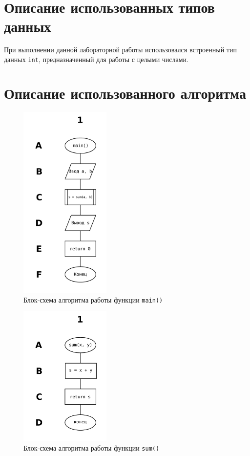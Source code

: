 \documentclass[12pt,a4paper,oneside]{article}
\begin{document}
\section{Описание использованных типов данных}

При выполнении данной лабораторной работы использовался
встроенный тип данных \texttt{int},
предназначенный для работы с целыми числами.


\section{Описание использованного алгоритма}

\begin{figure}[H]
  \centering
  \includegraphics[width=0.4\textwidth]{fc_main}
  \caption{Блок-схема алгоритма работы функции \texttt{main()}}
\end{figure}

\begin{figure}[H]
  \centering
  \includegraphics[width=0.4\textwidth]{fc_sum}
  \caption{Блок-схема алгоритма работы функции \texttt{sum()}}
\end{figure}
\end{document}
